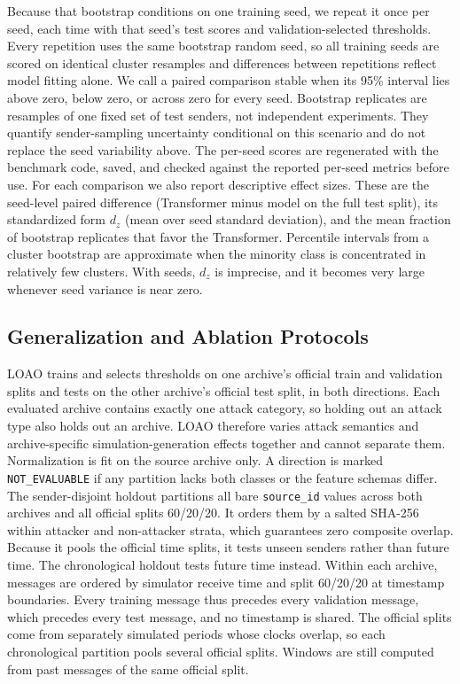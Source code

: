 \documentclass[preprint,12pt,numafflabel]{elsarticle}
\begin{document}
Because that bootstrap conditions on one training seed, we repeat it once per seed, each time with that seed's test scores and validation-selected thresholds. Every repetition uses the same bootstrap random seed, so all training seeds are scored on identical cluster resamples and differences between repetitions reflect model fitting alone. We call a paired comparison stable when its 95\% interval lies above zero, below zero, or across zero for every seed. Bootstrap replicates are resamples of one fixed set of test senders, not independent experiments. They quantify sender-sampling uncertainty conditional on this scenario and do not replace the seed variability above. The per-seed scores are regenerated with the benchmark code, saved, and checked against the reported per-seed metrics before use. For each comparison we also report descriptive effect sizes. These are the seed-level paired difference (Transformer minus model on the full test split), its standardized form $d_z$ (mean over seed standard deviation), and the mean fraction of bootstrap replicates that favor the Transformer. Percentile intervals from a cluster bootstrap are approximate when the minority class is concentrated in relatively few clusters. With \ResSeeds{} seeds, $d_z$ is imprecise, and it becomes very large whenever seed variance is near zero.

\subsection{Generalization and Ablation Protocols}
LOAO trains and selects thresholds on one archive's official train and validation splits and tests on the other archive's official test split, in both directions. Each evaluated archive contains exactly one attack category, so holding out an attack type also holds out an archive. LOAO therefore varies attack semantics and archive-specific simulation-generation effects together and cannot separate them. Normalization is fit on the source archive only. A direction is marked \texttt{NOT\_EVALUABLE} if any partition lacks both classes or the feature schemas differ. The sender-disjoint holdout partitions all bare \texttt{source\_id} values across both archives and all official splits 60/20/20. It orders them by a salted SHA-256 within attacker and non-attacker strata, which guarantees zero composite overlap. Because it pools the official time splits, it tests unseen senders rather than future time. The chronological holdout tests future time instead. Within each archive, messages are ordered by simulator receive time and split 60/20/20 at timestamp boundaries. Every training message thus precedes every validation message, which precedes every test message, and no timestamp is shared. The official splits come from separately simulated periods whose clocks overlap, so each chronological partition pools several official splits. Windows are still computed from past messages of the same official split.
\end{document}
